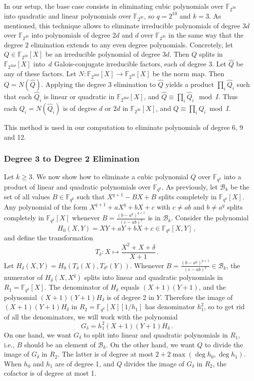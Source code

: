 \documentclass[11pt]{llncs}
\newcommand{\F}{\mathbb F}
\begin{document}
In our setup, the base case consists in eliminating cubic polynomials over $\F_{2^{30}}$ into quadratic and linear polynomials over $\F_{2^{30}}$, so $q = 2^{10}$ and $k = 3$.
As mentioned, this technique allows to eliminate irreducible polynomials of degree $3d$ over $\F_{2^{30}}$ into polynomials of degree $2d$ and $d$ over $\F_{2^{30}}$ in the same way that the degree $2$ elimination extends to any even degree polynomials.
Concretely, let $Q \in \F_{2^{30}}[X]$ be an irreducible polynomial of degree $3d$.  Then $Q$ splits in $\F_{2^{30d}}[X]$ into~$d$ Galois-conjugate irreducible factors, each of degree $3$.
Let $\hat Q$ be any of these factors. Let $N \colon \F_{2^{30d}}[X] \rightarrow \F_{2^{30}}[X]$ be the norm map. Then $Q = N(\hat Q)$. Applying the degree 3 elimination to $\hat Q$
yields a product $\prod_i \hat Q_i$ such that each $\hat Q_i$ is linear or quadratic in $\F_{2^{30d}}[X]$, and $\hat Q \equiv \prod_i \hat Q_i \mod I$.  Thus each $Q_i = N(\hat Q_i)$ is of degree
$d$ or $2d$ in $\F_{2^{30}}[X]$, and $Q \equiv \prod_i Q_i \bmod I$.

This method is used in our computation to eliminate polynomials of degree 6, 9 and 12.

\subsubsection{Degree 3 to Degree 2 Elimination}

Let $k \geq 3$.
We now show how to eliminate a cubic polynomial $Q$ over $\F_{q^k}$ into a product of linear and quadratic polynomials over $\F_{q^k}$.
As previously, let $\mathcal{B}_k$ be the set of all values $B \in \F_{q^k}$ such that $X^{q+1} - BX + B$ splits completely in $\F_{q^k}[X]$. Any polynomial of the form $X^{q+1}+aX^q + bX+c$ with $c \neq ab$ and $b\neq a^q$ splits completely in $\F_{q^k}[X]$ whenever $B = \frac{(b-a^q)^{q+1}}{(c-ab)^q}$ is in $\mathcal{B}_k$.
Consider the polynomial
\[ H_0(X, Y) = X Y + a Y + b X + c \in \F_{q^k}[X,Y] \,, \]
and define the transformation
\[ T_{\delta} \colon X \longmapsto \frac {X^2 + X + \delta} {X + 1} \,. \]
Let $H_{\delta}(X,Y) = H_0(T_{\delta}(X), T_{\delta^q}(Y))$.
Whenever $B = \frac{(b-a^q)^{q+1}}{(c-ab)^q} \in \mathcal{B}_k$, 
the numerator of $H_{\delta}(X,X^q)$ splits into linear and quadratic polynomials in $R_1 = \F_{q^k}[X]$. The denominator of $H_\delta$ equals $(X+1)(Y+1)$, and the polynomial $(X+1)(Y+1)H_\delta$ is of degree 2 in $Y$. Therefore the image of $(X+1)(Y+1)H_\delta$ in $R_2 = \F_{q^k}[X][1/h_1]$ has denominator $h_1^2$, so to get rid of all the denominators, we will work with the polynomial
\[ G_\delta = h_1^2(X + 1) (Y + 1) H_\delta \,. \]
On one hand, we want $G_\delta$ to split into linear and quadratic polynomials in $R_1$, i.e., $B$ should be an element of $\mathcal{B}_k$. On the other hand, we want $Q$ to divide the image of $G_\delta$ in $R_2$. The latter is of degree at most $2 + 2 \max(\deg h_0, \deg h_1)$. When $h_0$ and $h_1$ are of degree 1, and $Q$ divides the image of $G_\delta$ in $R_2$, the cofactor is of degree at most 1.
\end{document}
